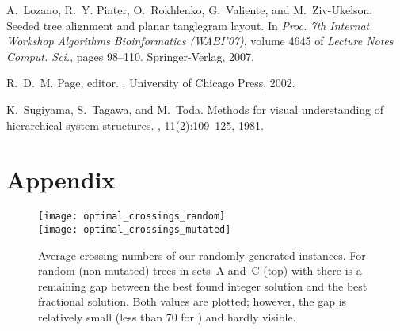 \documentclass[runningheads,a4paper]{llncs}
\begin{document}
\begin{thebibliography}{10}
A.~Lozano, R.~Y. Pinter, O.~Rokhlenko, G.~Valiente, and M.~Ziv-Ukelson.
\newblock Seeded tree alignment and planar tanglegram layout.
\newblock In {\em Proc. 7th Internat.
  Workshop Algorithms Bioinformatics (WABI'07)}, volume 4645 of {\em Lecture
  Notes Comput. Sci.}, pages 98--110. Springer-Verlag, 2007.

R.~D.~M. Page, editor.
.
\newblock University of Chicago Press, 2002.

K.~Sugiyama, S.~Tagawa, and M.~Toda.
\newblock Methods for visual understanding of hierarchical system structures.
,
  11(2):109--125, 1981.

\end{thebibliography}




\newpage
\appendix
\section*{Appendix}
\renewcommand{\textfraction}{0.1}
\begin{figure}[h]
  \centering
  \texttt{[image: optimal\_crossings\_random]}\\
  \texttt{[image: optimal\_crossings\_mutated]}
  \caption{Average crossing numbers of our randomly-generated
    instances. For random (non-mutated) trees in sets~A and~C (top)
    with  there is a remaining gap between the best found
    integer solution and the best fractional solution. Both values are
    plotted; however, the gap is relatively small (less than 70 for ) and hardly visible.}
  \label{fig:crnumbers-random}
\end{figure}
\end{document}
